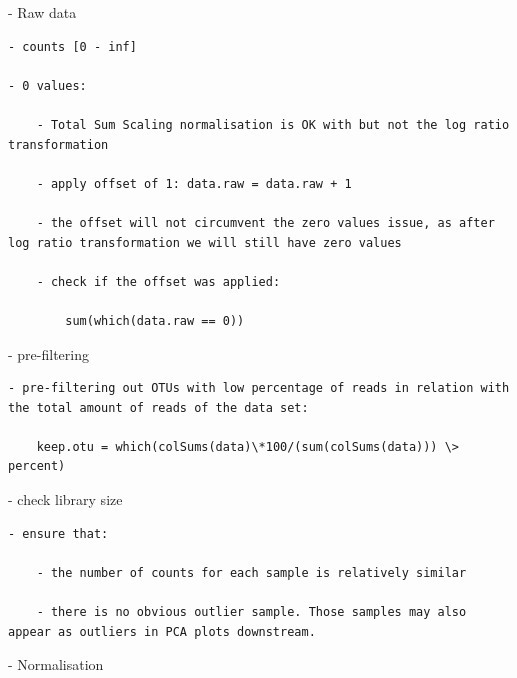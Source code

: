 \documentclass[
]{book}
\begin{document}
- Raw data

\begin{verbatim}
- counts [0 - inf]

- 0 values:

    - Total Sum Scaling normalisation is OK with but not the log ratio transformation

    - apply offset of 1: data.raw = data.raw + 1

    - the offset will not circumvent the zero values issue, as after log ratio transformation we will still have zero values

    - check if the offset was applied:

        sum(which(data.raw == 0))
\end{verbatim}

- pre-filtering

\begin{verbatim}
- pre-filtering out OTUs with low percentage of reads in relation with the total amount of reads of the data set:

    keep.otu = which(colSums(data)\*100/(sum(colSums(data))) \> percent)
\end{verbatim}

- check library size

\begin{verbatim}
- ensure that:

    - the number of counts for each sample is relatively similar

    - there is no obvious outlier sample. Those samples may also appear as outliers in PCA plots downstream.
\end{verbatim}

- Normalisation
\end{document}
